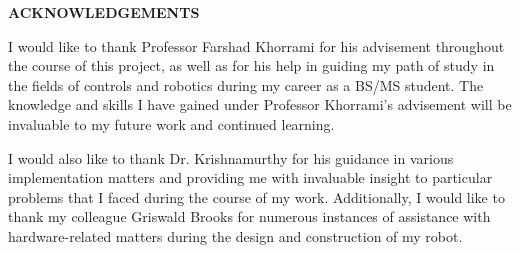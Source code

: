 \clearpage
\vspace*{\fill}
	\begin{center}
		\begin{minipage}{\textwidth}
			{\begin{center}{\textbf{ACKNOWLEDGEMENTS}}\end{center}\vspace{10mm}}

			I would like to thank Professor Farshad Khorrami for his advisement throughout the course of this project, as well as for his help in guiding my path of study in the fields of controls and robotics during my career as a BS/MS student. The knowledge and skills I have gained under Professor Khorrami's advisement will be invaluable to my future work and continued learning. %
			
			\vspace{5mm}
			\hspace{5mm} 
			I would also like to thank Dr. Krishnamurthy for his guidance in various implementation matters and providing me with invaluable insight to particular problems that I faced during the course of my work. Additionally, I would like to thank my colleague Griswald Brooks for numerous instances of assistance with hardware-related matters during the design and construction of my robot. 
		\end{minipage}
	\end{center}
\vfill %
\clearpage
